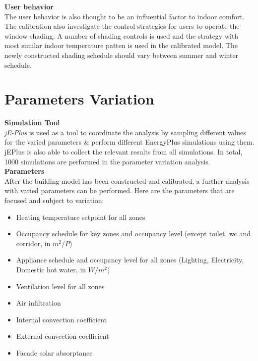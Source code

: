 \documentclass[a4paper, oneside]{discothesis}
\begin{document}
		\textbf{User behavior}\\
			The user behavior is also thought to be an influential factor to indoor comfort. The calibration also investigate the control strategies for users to operate the window shading. A number of shading controls is used and the strategy with most similar indoor temperature patten is used in the calibrated model. The newly constructed shading schedule should vary between summer and winter schedule.\\


	\section{Parameters Variation}
		
		
		\textbf{Simulation Tool}\\
		\textit{jE-Plus} is used as a tool to coordinate the analysis by sampling different values for the varied parameters \& perform different EnergyPlus simulations using them. jEPlus is also able to collect the relevant results from all simulations. In total, 1000 simulations are performed in the parameter variation analysis.\\

		\textbf{Parameters}\\

		After the building model has been constructed and calibrated, a further analysis with varied parameters can be performed. Here are the parameters that are focused and subject to variation:\\
		\begin{itemize}
			\item Heating temperature setpoint for all zones
			\item Occupancy schedule for key zones and occupancy level (except toilet, wc and corridor, in $m^2/P$)
			\item Appliance schedule and occupancy level for all zones (Lighting, Electricity, Domestic hot water, in $W/m^2$)			\item Ventilation level for all zones
			\item Air infiltration
			\item Internal convection coefficient
			\item External convection coefficient
			\item Facade solar absorptance\\
		\end{itemize}
\end{document}
